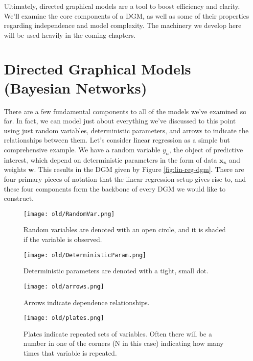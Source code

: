 Ultimately, directed graphical models are a tool to boost efficiency and clarity. We'll examine the core components of a DGM, as well as some of their properties regarding independence and model complexity. The machinery we develop here will be used heavily in the coming chapters.

\section{Directed Graphical Models (Bayesian Networks)}
There are a few fundamental components to all of the models we've examined so far. In fact, we can model just about everything we've discussed to this point using just random variables, deterministic parameters, and arrows to indicate the relationships between them. Let's consider linear regression as a simple but comprehensive example. We have a random variable $y_n$, the object of predictive interest, which depend on deterministic parameters in the form of data $\textbf{x}_n$ and weights $\textbf{w}$. This results in the DGM given by Figure \ref{fig:lin-reg-dgm}. There are four primary pieces of notation that the linear regression setup gives rise to, and these four components form the backbone of every DGM we would like to construct.

\begin{figure}
    \centering
    \texttt{[image: old/RandomVar.png]}
    \caption{Random variables are denoted with an open circle, and it is shaded if the variable is observed.}
    \label{fig:random-var}
\end{figure}
\begin{figure}
    \centering
    \texttt{[image: old/DeterministicParam.png]}
    \caption{Deterministic parameters are denoted with a tight, small dot.}
    \label{fig:deterministic-param}
\end{figure}
\begin{figure}
    \centering
    \texttt{[image: old/arrows.png]}
    \caption{Arrows indicate dependence relationships.}
    \label{fig:arrows}
\end{figure}
\begin{figure}
    \centering
    \texttt{[image: old/plates.png]}
    \caption{Plates indicate repeated sets of variables. Often there will be a number in one of the corners (N in this case) indicating how many times that variable is repeated.}
    \label{fig:plates}
\end{figure}

